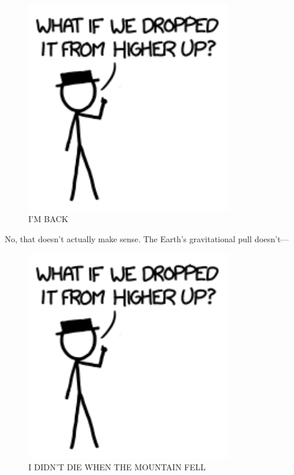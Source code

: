 {\begin{figure}[!htbp]
\centering
\includegraphics[scale=0.5, max width=0.8\textwidth]{imgs/a/57/mountain_hat.png}
\caption{I'M BACK}
\end{figure}

{No, that doesn't actually make sense. The Earth's gravitational pull doesn't—}

\begin{figure}[!htbp]
\centering
\includegraphics[scale=0.5, max width=0.8\textwidth]{imgs/a/57/mountain_hat.png}
\caption{I DIDN'T DIE WHEN THE MOUNTAIN FELL}
\end{figure}

}
